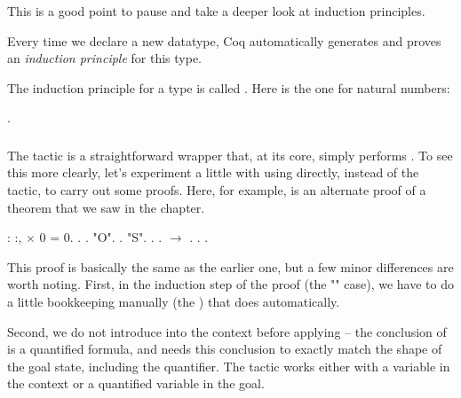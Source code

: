 \documentclass[12pt]{report}
\begin{document}
 This is a good point to pause and take a deeper look at induction
    principles. 


    Every time we declare a new  datatype, Coq
    automatically generates and proves an \textit{induction principle} 
    for this type.


    The induction principle for a type  is called .  Here is
    the one for natural numbers: \begin{coqdoccode}
\coqdocemptyline
\coqdocnoindent
{} .\coqdoceol
\coqdocemptyline
\end{coqdoccode}
\subsubsection{ }

 The  tactic is a straightforward wrapper that, at
    its core, simply performs  .  To see this more
    clearly, let's experiment a little with using  
    directly, instead of the  tactic, to carry out some
    proofs.  Here, for example, is an alternate proof of a theorem
    that we saw in the  chapter. \begin{coqdoccode}
\coqdocemptyline
\coqdocnoindent
{}  : \coqdockw{\ensuremath{\forall}} :, \coqdoceol
\coqdocindent{1.00em}
 \ensuremath{\times} 0 = 0.\coqdoceol
\coqdocnoindent
{}.\coqdoceol
\coqdocindent{1.00em}
 .\coqdoceol
\coqdocindent{1.00em}
 "O". .\coqdoceol
\coqdocindent{1.00em}
 "S". .   .  \ensuremath{\rightarrow} .\coqdoceol
\coqdocindent{2.00em}
. .\coqdoceol
\coqdocemptyline
\end{coqdoccode}
This proof is basically the same as the earlier one, but a
    few minor differences are worth noting.  First, in the induction
    step of the proof (the "" case), we have to do a little
    bookkeeping manually (the ) that  does
    automatically.


    Second, we do not introduce  into the context before applying
     -- the conclusion of  is a quantified formula,
    and  needs this conclusion to exactly match the shape of
    the goal state, including the quantifier.  The  tactic
    works either with a variable in the context or a quantified
    variable in the goal.
\end{document}
